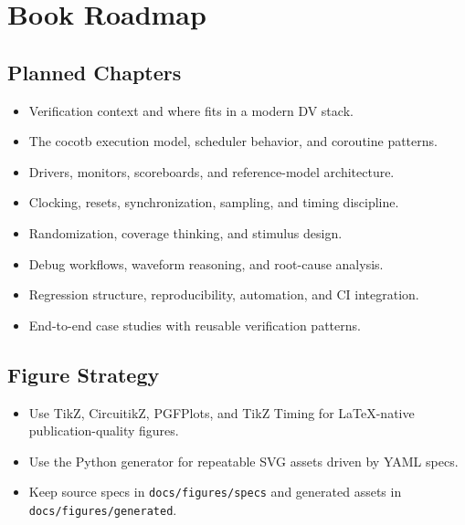 \chapter{Book Roadmap}
\label{ch:roadmap}


\section*{Planned Chapters}
\begin{itemize}
  \item Verification context and where \cocotb{} fits in a modern DV stack.
  \item The cocotb execution model, scheduler behavior, and coroutine patterns.
  \item Drivers, monitors, scoreboards, and reference-model architecture.
  \item Clocking, resets, synchronization, sampling, and timing discipline.
  \item Randomization, coverage thinking, and stimulus design.
  \item Debug workflows, waveform reasoning, and root-cause analysis.
  \item Regression structure, reproducibility, automation, and CI integration.
  \item End-to-end case studies with reusable verification patterns.
\end{itemize}

\section*{Figure Strategy}
\begin{itemize}
  \item Use TikZ, CircuitikZ, PGFPlots, and TikZ Timing for LaTeX-native publication-quality figures.
  \item Use the Python generator for repeatable SVG assets driven by YAML specs.
  \item Keep source specs in \texttt{docs/figures/specs} and generated assets in \texttt{docs/figures/generated}.
\end{itemize}
